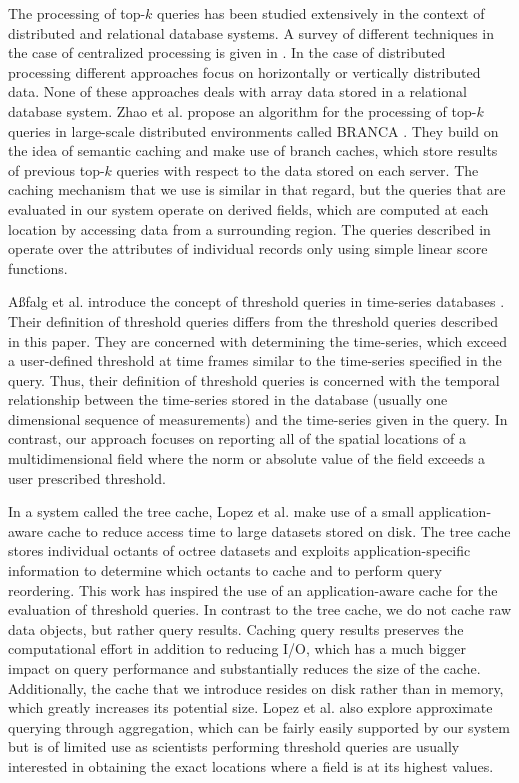 \documentclass{sig-alternate}
\begin{document}
The processing of top-$k$ queries has been studied extensively in the context of distributed and relational database systems. A survey of different techniques
in the case of centralized processing is given in \cite{Ilyas}. In the case of distributed processing different approaches focus on horizontally 
\cite{Balke, Vlachou} or vertically \cite{Cao, Chaudhuri, Guntzer, Marian, Michel} distributed data. None of these approaches deals with array data stored in
a relational database system. Zhao et al. propose an algorithm for the processing of top-$k$ queries in large-scale distributed environments called BRANCA
\cite{Zhao}. They build on the idea of semantic caching \cite{Ren} and make use of branch caches, which store results of previous top-$k$ queries with respect 
to the data stored on each server. The caching mechanism that we use is similar in that regard, but the queries that are evaluated in our system operate on
derived fields, which are computed at each location by accessing data from a surrounding region. The queries described in \cite{Zhao} operate over the 
attributes of individual records only using simple linear score functions.

A{\ss}falg et al. introduce the concept of threshold queries in time-series databases \cite{Asfalg}. Their definition of threshold queries differs from the threshold
queries described in this paper. They are concerned with determining the time-series, which exceed a user-defined threshold at time frames similar to
the time-series specified in the query. Thus, their definition of threshold queries is concerned with the temporal relationship between the time-series
stored in the database (usually one dimensional sequence of measurements) and the time-series given in the query. In contrast, our approach focuses on
reporting all of the spatial locations of a multidimensional field where the norm or absolute value of the field exceeds a user prescribed threshold.

In a system called the tree cache, Lopez et al. \cite{Lopez} make use of a small application-aware cache to reduce access time to large datasets stored on
disk. The tree cache stores individual octants of octree datasets and exploits application-specific information to determine which octants to cache and to 
perform query reordering. This work has inspired the use of an application-aware cache for the evaluation of threshold queries. In contrast to the tree cache,
we do not cache raw data objects, but rather query results. Caching query results preserves the computational effort in addition to reducing I/O, which has a
much bigger impact on query performance and substantially reduces the size of the cache. Additionally, the cache that we introduce resides on disk rather 
than in memory, which greatly increases its potential size. Lopez et al. also explore approximate querying through aggregation, which can be fairly easily
supported by our system but is of limited use as scientists performing threshold queries are usually interested in obtaining the exact locations where a field is 
at its highest values.
\end{document}
